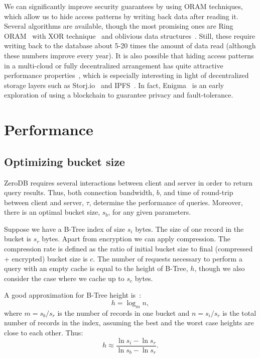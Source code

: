 \documentclass[notitlepage,longbibliography]{revtex4-1}
\begin{document}
We can significantly improve security guarantees by using ORAM techniques, which allow us to hide access patterns by writing back data after reading it.
Several algorithms are available, though the most promising ones are Ring ORAM~\cite{practical-oram} with XOR technique~\cite{burst-oram}
and oblivious data structures~\cite{ods-wang-2014}.
Still, these require writing back to the database about 5-20 times the amount of data read (although these numbers improve every year).
It is also possible that hiding access patterns in a multi-cloud or fully decentralized arrangement has quite attractive performance properties~\cite{oram-multicloud},
which is especially interesting in light of decentralized storage layers such as Storj.io~\cite{storj} and IPFS~\cite{ipfs}.
In fact, Enigma~\cite{enigma} is an early exploration of using a blockchain to guarantee privacy and fault-tolerance.

\section{Performance}

\subsection{Optimizing bucket size}


ZeroDB requires several interactions between client and server in order to return query results.
Thus, both connection bandwidth, $b$, and time of round-trip between client and server, $\tau$, determine the performance of queries.
Moreover, there is an optimal bucket size, $s_b$, for any given parameters.

Suppose we have a B-Tree index of size $s_i$ bytes.
The size of one record in the bucket is $s_r$ bytes.
Apart from encryption we can apply compression.
The compression rate is defined as the ratio of initial bucket size to final (compressed + encrypted) bucket size is $c$.
The number of requests necessary to perform a query with an empty cache is equal to the height of B-Tree, $h$, though we also consider the case where we cache up to $s_c$ bytes.


A good approximation for B-Tree height is~\cite{wiki:b-tree}:
$$h = \log_m n,$$
where $m = s_b/s_r$ is the number of records in one bucket and $n = s_i/s_r$ is the total number of records in the index,
assuming the best and the worst case heights are close to each other.
Thus:
$$h \approx \frac{\ln s_i - \ln s_r}{\ln s_b - \ln s_r}.$$
\end{document}
